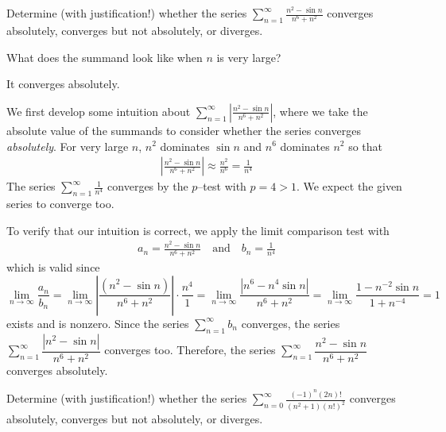 \begin{Mquestion}[2012A]
Determine (with justification!) whether the series
$\displaystyle\sum_{n=1}^\infty\frac{n^2-\sin n}{n^6+n^2}$
converges absolutely, converges but not absolutely, or diverges.
\end{Mquestion}

\begin{hint}
What does the summand look like when $n$ is very large?
\end{hint}

\begin{answer}
It converges absolutely.
\end{answer}

\begin{solution}
We first develop some intuition about $\displaystyle\sum_{n=1}^\infty\left|\frac{n^2-\sin n}{n^6+n^2}\right|$, where we take the absolute value of the summands to consider whether the series converges \emph{absolutely}. For very large $n$, $n^2$ dominates
$\sin n$ and $n^6$ dominates $n^2$ so that
\begin{align*}
\left|\frac{n^2-\sin n}{n^6+n^2}\right|
\approx \frac{n^2}{n^6}
=\frac{1}{n^4}
\end{align*}
The series $\displaystyle \sum_{n=1}^{\infty} \frac{1}{n^4}$
converges by the $p$--test with $p=4>1$.
We expect the given series to converge too.

To verify that  our intuition is correct,
we apply the limit comparison test with
\begin{align*}
a_n= \frac{n^2-\sin n}{n^6+n^2} \quad\text{and}\quad b_n= \frac{1}{n^4}
\end{align*}
which is valid since
\begin{equation*}
\lim_{n\rightarrow\infty} \frac{a_n}{b_n}
=\lim_{n\rightarrow\infty}\left|\frac{(n^2-\sin n)}{n^6+n^2}\right|\cdot\frac{n^4}{1}
=\lim_{n\rightarrow\infty}\frac{|n^6-n^4\sin n|}{n^6+n^2}
=\lim_{n\rightarrow\infty}\frac{1-n^{-2}\sin n}{1+n^{-4}}
=1
\end{equation*}
exists and is nonzero. Since the series $\sum\limits_{n=1}^\infty b_n$
converges, the series $\sum\limits_{n=1}^\infty\dfrac{|n^2-\sin n|}{n^6+n^2}$ converges too. Therefore, the series $\sum\limits_{n=1}^\infty\dfrac{n^2-\sin n}{n^6+n^2}$ converges absolutely.
\end{solution}

\begin{Mquestion}[2012A]
Determine (with justification!) whether the series
$\displaystyle\sum_{n=0}^\infty\frac{(-1)^n(2n)!}{(n^2+1)(n!)^2}$
converges absolutely, converges but not absolutely, or diverges.
\end{Mquestion}

